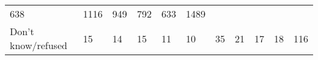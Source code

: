 \documentclass[]{article}
\begin{document}
\begin{longtable}[]{@{}lllllllllll@{}}
\begin{minipage}[t]{0.05\columnwidth}
638\strut
\end{minipage} & \begin{minipage}[t]{0.05\columnwidth}\raggedright
1116\strut
\end{minipage} & \begin{minipage}[t]{0.06\columnwidth}\raggedright
949\strut
\end{minipage} & \begin{minipage}[t]{0.06\columnwidth}\raggedright
792\strut
\end{minipage} & \begin{minipage}[t]{0.04\columnwidth}\raggedright
633\strut
\end{minipage} & \begin{minipage}[t]{0.11\columnwidth}\raggedright
1489\strut
\end{minipage}\tabularnewline
\begin{minipage}[t]{0.14\columnwidth}\raggedright
Don't know/refused\strut
\end{minipage} & \begin{minipage}[t]{0.04\columnwidth}\raggedright
15\strut
\end{minipage} & \begin{minipage}[t]{0.05\columnwidth}\raggedright
14\strut
\end{minipage} & \begin{minipage}[t]{0.05\columnwidth}\raggedright
15\strut
\end{minipage} & \begin{minipage}[t]{0.05\columnwidth}\raggedright
11\strut
\end{minipage} & \begin{minipage}[t]{0.05\columnwidth}\raggedright
10\strut
\end{minipage} & \begin{minipage}[t]{0.05\columnwidth}\raggedright
35\strut
\end{minipage} & \begin{minipage}[t]{0.06\columnwidth}\raggedright
21\strut
\end{minipage} & \begin{minipage}[t]{0.06\columnwidth}\raggedright
17\strut
\end{minipage} & \begin{minipage}[t]{0.04\columnwidth}\raggedright
18\strut
\end{minipage} & \begin{minipage}[t]{0.11\columnwidth}\raggedright
116\strut
\end{minipage}\tabularnewline

\end{longtable}
\end{document}
